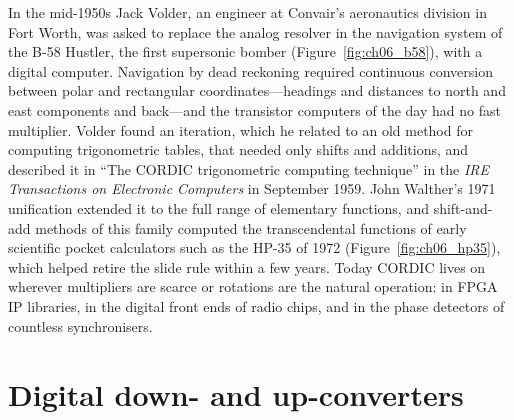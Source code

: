 
\begin{history}
In the mid-1950s Jack Volder, an engineer at Convair's aeronautics division in Fort Worth, was asked to
replace the analog resolver in the navigation system of the B-58 Hustler, the first supersonic
bomber (Figure~\ref{fig:ch06_b58}), with a digital computer. Navigation by dead reckoning required
continuous conversion between polar and rectangular coordinates---headings and distances to north
and east components and back---and the transistor computers of the day had no fast multiplier.
Volder found an iteration, which he related to an old method for computing trigonometric tables,
that needed only shifts and additions, and described it in ``The CORDIC trigonometric computing
technique'' in the \emph{IRE Transactions on Electronic Computers} in September 1959. John Walther's
1971 unification extended it to the full range of elementary functions, and shift-and-add methods of
this family computed the transcendental functions of early scientific pocket calculators such as the
HP-35 of 1972 (Figure~\ref{fig:ch06_hp35}), which helped retire the slide rule within a few years. Today
CORDIC lives on wherever multipliers are scarce or rotations are the natural operation: in FPGA IP
libraries, in the digital front ends of radio chips, and in the phase detectors of countless
synchronisers.
\end{history}

\section{Digital down- and up-converters}
\label{sec:ch06:ddc}

